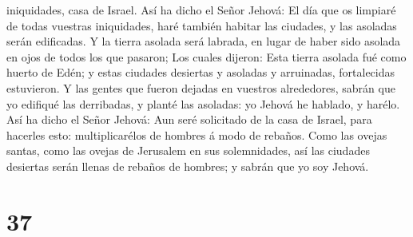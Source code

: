 iniquidades, casa de Israel.  Así ha dicho el Señor
Jehová: El día que os limpiaré de todas vuestras iniquidades, haré
también habitar las ciudades, y las asoladas serán edificadas.
 Y la tierra asolada será labrada, en lugar de haber sido
asolada en ojos de todos los que pasaron;  Los cuales
dijeron: Esta tierra asolada fué como huerto de Edén; y estas ciudades
desiertas y asoladas y arruinadas, fortalecidas estuvieron.
 Y las gentes que fueron dejadas en vuestros alrededores,
sabrán que yo edifiqué las derribadas, y planté las asoladas: yo Jehová
he hablado, y harélo.  Así ha dicho el Señor Jehová: Aun
seré solicitado de la casa de Israel, para hacerles esto:
multiplicarélos de hombres á modo de rebaños.  Como las
ovejas santas, como las ovejas de Jerusalem en sus solemnidades, así las
ciudades desiertas serán llenas de rebaños de hombres; y sabrán que yo
soy Jehová.

\hypertarget{section-36}{%
\section{37}\label{section-36}}

